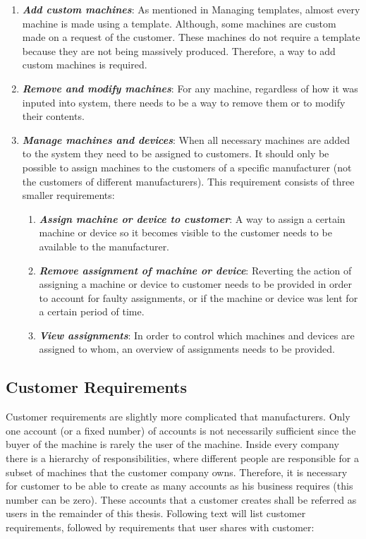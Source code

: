 \begin{enumerate}
	\item \textbf{\textit{Add custom machines}}: As mentioned in Managing templates, almost every machine is made using a template. Although, some machines are custom made on a request of the customer. These machines do not require a template because they are not being massively produced. Therefore, a way to add custom machines is required.

	\item \textbf{\textit{Remove and modify machines}}: For any machine, regardless of how it was inputed into system, there needs to be a way to remove them or to modify their contents.

	\item \textbf{\textit{Manage machines and devices}}: When all necessary machines are added to the system they need to be assigned to customers. It should only be possible to assign machines to the customers of a specific manufacturer (not the customers of different manufacturers). This requirement consists of three smaller requirements:
		\begin{enumerate}
			\item \textbf{\textit{Assign machine or device to customer}}: A way to assign a certain machine or device so it becomes visible to the customer needs to be available to the manufacturer.
			\item \textbf{\textit{Remove assignment of machine or device}}: Reverting the action of assigning a machine or device to customer needs to be provided in order to account for faulty assignments, or if the machine or device was lent for a certain period of time.
			\item \textbf{\textit{View assignments}}: In order to control which machines and devices are assigned to whom, an overview of assignments needs to be provided.
		\end{enumerate}
\end{enumerate}

\subsection{Customer Requirements}

Customer requirements are slightly more complicated that manufacturers. Only one account (or a fixed number) of accounts is not necessarily sufficient since the buyer of the machine is rarely the user of the machine. Inside every company there is a hierarchy of responsibilities, where different people are responsible for a subset of machines that the customer company owns. Therefore, it is necessary for customer to be able to create as many accounts as his business requires (this number can be zero). These accounts that a customer creates shall be referred as users in the remainder of this thesis. Following text will list customer requirements, followed by requirements that user shares with customer:

